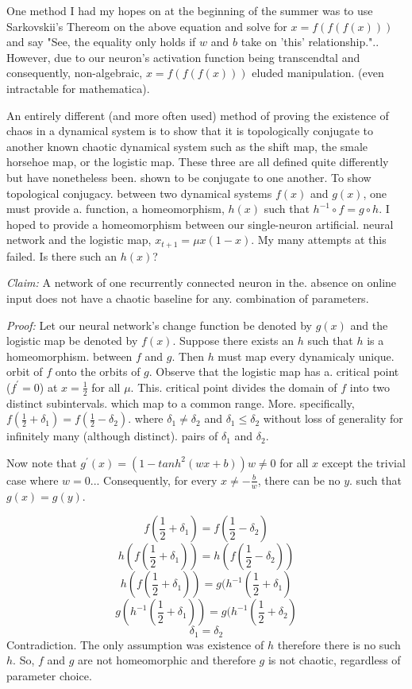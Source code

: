 \documentclass[12pt]{article}
\begin{document}
One method I had my hopes on at the beginning of the summer was to use Sarkovskii's Thereom on the above equation and solve for $x = f(f(f(x)))$ and say "See, the equality only holds if $w$ and $b$ take on 'this' relationship."..
However, due to our neuron's activation function being transcendtal and
consequently, non-algebraic, $x = f(f(f(x)))$ eluded manipulation.
(even intractable for mathematica).

An entirely different (and more often used) method of proving the existence
of chaos in a dynamical system is to show that it is topologically conjugate
to another known chaotic dynamical system such as the shift map, the smale horsehoe map,
or the logistic map.
These three are all defined quite differently but have nonetheless been.
shown to be conjugate to one another.  To show topological conjugacy.
between two dynamical systems $f(x)$ and $g(x)$, one must provide a.
function, a homeomorphism, $h(x)$ such that $h^{-1} \circ f = g \circ h$.
I hoped to provide a homeomorphism between our single-neuron artificial.
neural network and the logistic map, $x_{t+1} = \mu x (1-x)$.  
My many attempts at this failed.  Is there such an $h(x)$?

\textit{Claim:}  A network of one recurrently connected neuron in the.
absence on online input does not have a chaotic baseline for any.
combination of parameters.

\textit{Proof:}
Let our neural network's change function be denoted by $g(x)$ and the logistic map be denoted by $f(x)$.
Suppose there exists an $h$ such that $h$ is a homeomorphism.
between $f$ and $g$.  Then $h$ must map every dynamicaly unique.
orbit of $f$ onto the orbits of $g$.  Observe that the logistic map has a.
critical point ($f^{\prime} = 0$) at $x=\frac{1}{2}$ for all $\mu$.  This.
critical point divides the domain of $f$ into two distinct subintervals.
which map to a common range.  More.
specifically, $f(\frac{1}{2} + \delta_{1}) = f(\frac{1}{2} - \delta_{2})$.
where $\delta_{1} \neq \delta_{2}$ and $\delta_{1} \le \delta_{2}$ without loss of generality for infinitely many (although distinct).
pairs of $\delta_{1}$ and $\delta_{2}$.

Now note that $g^{\prime}(x) = (1 - tanh^{2}(wx+b))w \neq 0$ for all $x$ except the trivial case where $w=0$...
Consequently, for every $x \neq -\frac{b}{w}$, there can be no $y$.
such that $g(x) = g(y)$.

$$f(\frac{1}{2} + \delta_{1}) = f(\frac{1}{2} - \delta_{2})$$
$$h(f(\frac{1}{2} + \delta_{1})) = h(f(\frac{1}{2} - \delta_{2}))$$
$$h(f(\frac{1}{2} + \delta_{1})) = g(h^{-1}(\frac{1}{2} + \delta_{1})$$
$$g(h^{-1}(\frac{1}{2} + \delta_{1})) = g(h^{-1}(\frac{1}{2} + \delta_{2})$$
$$\delta_{1} = \delta_{2}$$
   Contradiction.  The only assumption was existence of $h$ therefore there 
   is no such $h$. So, $f$ and $g$ are not homeomorphic and therefore $g$ 
   is not chaotic, regardless of parameter choice.
\end{document}
